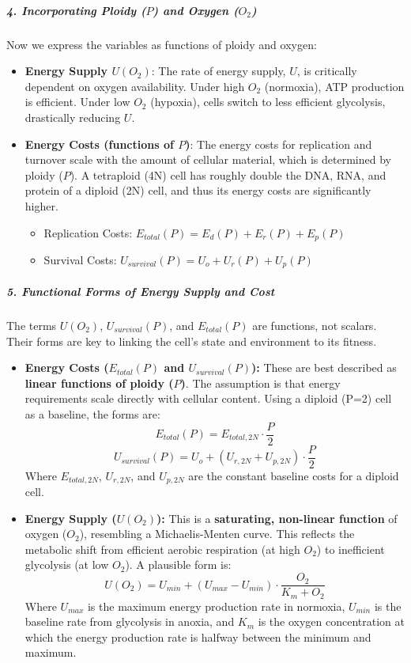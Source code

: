 \documentclass{article}
\begin{document}
\subparagraph{4. Incorporating Ploidy ($P$) and Oxygen ($O_2$)}
Now we express the variables as functions of ploidy and oxygen:
\begin{itemize}
    \item \textbf{Energy Supply $U(O_2)$}: The rate of energy supply, $U$, is critically dependent on oxygen availability. Under high $O_2$ (normoxia), ATP production is efficient. Under low $O_2$ (hypoxia), cells switch to less efficient glycolysis, drastically reducing $U$.
    \item \textbf{Energy Costs (functions of $P$)}: The energy costs for replication and turnover scale with the amount of cellular material, which is determined by ploidy ($P$). A tetraploid (4N) cell has roughly double the DNA, RNA, and protein of a diploid (2N) cell, and thus its energy costs are significantly higher.
    \begin{itemize}
        \item Replication Costs: $E_{total}(P) = E_d(P) + E_r(P) + E_p(P)$
        \item Survival Costs: $U_{survival}(P) = U_o + U_r(P) + U_p(P)$
    \end{itemize}
\end{itemize}


\subparagraph{5. Functional Forms of Energy Supply and Cost}
The terms $U(O_2)$, $U_{survival}(P)$, and $E_{total}(P)$ are functions, not scalars. Their forms are key to linking the cell's state and environment to its fitness.

\color{blue}
\begin{itemize}
    \item \textbf{Energy Costs ($E_{total}(P)$ and $U_{survival}(P)$):} These are best described as \textbf{linear functions of ploidy ($P$)}. The assumption is that energy requirements scale directly with cellular content. Using a diploid (P=2) cell as a baseline, the forms are:
    $$ E_{total}(P) = E_{total, 2N} \cdot \frac{P}{2} $$
    $$ U_{survival}(P) = U_o + (U_{r, 2N} + U_{p, 2N}) \cdot \frac{P}{2} $$
    Where $E_{total, 2N}$, $U_{r, 2N}$, and $U_{p, 2N}$ are the constant baseline costs for a diploid cell.

    \item \textbf{Energy Supply ($U(O_2)$):} This is a \textbf{saturating, non-linear function} of oxygen ($O_2$), resembling a Michaelis-Menten curve. This reflects the metabolic shift from efficient aerobic respiration (at high $O_2$) to inefficient glycolysis (at low $O_2$). A plausible form is:
    $$ U(O_2) = U_{min} + (U_{max} - U_{min}) \cdot \frac{O_2}{K_m + O_2} $$
    Where $U_{max}$ is the maximum energy production rate in normoxia, $U_{min}$ is the baseline rate from glycolysis in anoxia, and $K_m$ is the oxygen concentration at which the energy production rate is halfway between the minimum and maximum.
\end{itemize}
\color{black}
\end{document}
